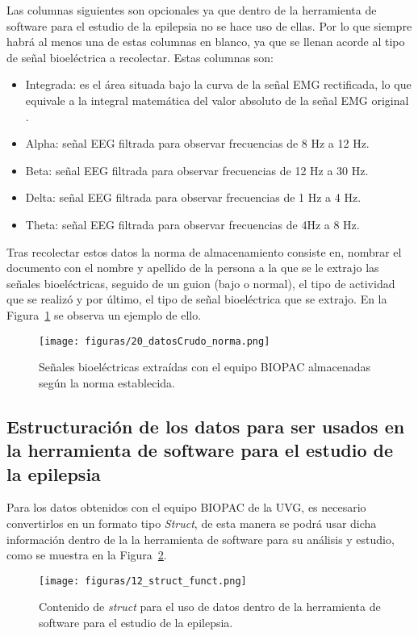 Las columnas siguientes son opcionales ya que dentro de la herramienta de software para el estudio de la epilepsia no se hace uso de ellas. Por lo que siempre habrá al menos una de estas columnas en blanco, ya que se llenan acorde al tipo de señal bioeléctrica a recolectar. Estas columnas son:
\begin{itemize}
    \item Integrada: es el área situada bajo la curva de la señal EMG rectificada, lo que equivale a la integral matemática del valor absoluto de la señal EMG original \cite{BIOPAC}.
    \item Alpha: señal EEG filtrada para observar frecuencias de 8 Hz a 12 Hz.
    \item Beta: señal EEG filtrada para observar frecuencias de 12 Hz a 30 Hz.
    \item Delta: señal EEG filtrada para observar frecuencias de 1 Hz a 4 Hz.
    \item Theta: señal EEG filtrada para observar frecuencias de 4Hz a 8 Hz.
\end{itemize}


Tras recolectar estos datos la norma de almacenamiento consiste en, nombrar el documento con el nombre y apellido de la persona a la que se le extrajo las señales bioeléctricas, seguido de un guion (bajo o normal), el tipo de actividad que se realizó y por último, el tipo de señal bioeléctrica que se extrajo. En la Figura~\ref{fig:dataCruda_almacenada} se observa un ejemplo de ello.

\begin{figure}[H]
    \centering
    \texttt{[image: figuras/20\_datosCrudo\_norma.png]}
    \caption{Señales bioeléctricas extraídas con el equipo BIOPAC almacenadas según la norma establecida.}
    \label{fig:dataCruda_almacenada}
\end{figure}

\subsection{Estructuración de los datos para ser usados en la herramienta de software para el estudio de la epilepsia}
Para los datos obtenidos con el equipo BIOPAC de la UVG, es necesario convertirlos en un formato tipo \textit{\gls{Struct}}, de esta manera se podrá usar dicha información dentro de la la herramienta de software para su análisis y estudio, como se muestra en la Figura~\ref{fig:struc_func}. 

\begin{figure}[H]
    \centering
    \texttt{[image: figuras/12\_struct\_funct.png]}
    \caption{Contenido de \textit{struct} para el uso de datos dentro de la herramienta de software para el estudio de la epilepsia.}
    \label{fig:struc_func}
\end{figure}

